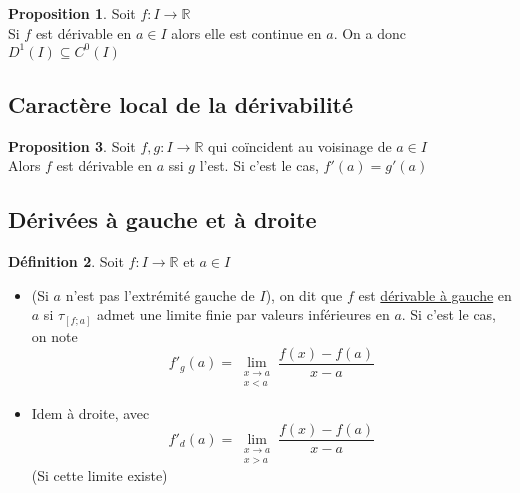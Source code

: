 \documentclass[10pt,a4paper]{article}
\theoremstyle{definition}
\newtheorem{proposition}{Proposition}[section]
\newtheorem{definition}[proposition]{Définition}
\begin{document}
\begin{proposition}
Soit $f: I \to \mathbb{R}$ \\
Si $f$ est dérivable en $a \in I$ alors elle est continue en $a$. On a donc $D^1(I) \subseteq C^0(I)$
\end{proposition}

\subsection{Caractère local de la dérivabilité}
\begin{proposition}
Soit $f, g: I \to \mathbb{R}$ qui coïncident au voisinage de $a \in I$ \\
Alors $f$ est dérivable en $a$ ssi $g$ l'est. Si c'est le cas, $f'(a) = g'(a)$

\subsection{Dérivées à gauche et à droite}
\begin{definition}
Soit $f: I \to \mathbb{R}$ et $a \in I$
\begin{itemize}
\item (Si $a$ n'est pas l'extrémité gauche de $I$), on dit que $f$ est \uline{dérivable à gauche} en $a$ si $\tau_{[f;a]}$ admet une limite finie par valeurs inférieures en $a$. Si c'est le cas, on note
\[f'_g(a) = \lim\limits_{\substack{x \to a \\ x < a}} \frac{f(x) - f(a)}{x - a}\]
\item Idem à droite, avec
\[f'_d(a) = \lim\limits_{\substack{x \to a \\ x > a}} \frac{f(x) - f(a)}{x - a}\]
(Si cette limite existe)
\end{itemize}
\end{definition}
\end{proposition}
\end{document}
